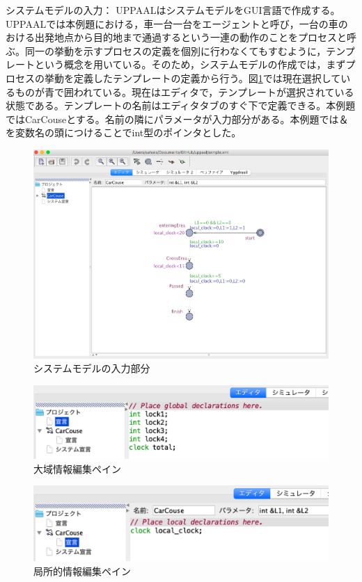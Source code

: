 \documentclass{tpu-sotu}
\begin{document}
	システムモデルの入力：
	UPPAALはシステムモデルをGUI言語で作成する。UPPAALでは本例題における，車一台一台をエージェントと呼び，一台の車のおける出発地点から目的地まで通過するという一連の動作のことをプロセスと呼ぶ。同一の挙動を示すプロセスの定義を個別に行わなくてもすむように，テンプレートという概念を用いている。そのため，システムモデルの作成では，まずプロセスの挙動を定義したテンプレートの定義から行う。図\ref{CC}では現在選択しているものが青で囲われている。現在はエディタで，テンプレートが選択されている状態である。テンプレートの名前はエディタタブのすぐ下で定義できる。本例題ではCarCouseとする。名前の隣にパラメータが入力部分がある。本例題では＆を変数名の頭につけることでint型のポインタとした。
	\begin{figure}[htbp]
	\centering
	\includegraphics[width=160mm]{CarCouse.png}
	\caption{システムモデルの入力部分}
	\label{CC}
	\end{figure}
	\begin{figure}[htbp]
	\centering
	\includegraphics[width=140mm]{GlobalDec.png}
	\caption{大域情報編集ペイン}
	\label{GD}
	\end{figure}
	\begin{figure}[htbp]
	\centering
	\includegraphics[width=140mm]{LocalDec.png}
	\caption{局所的情報編集ペイン}
	\label{LD}
	\end{figure}
\end{document}
